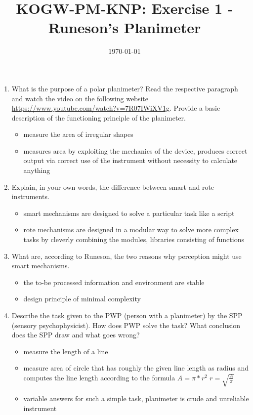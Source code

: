 \documentclass[12pt,english]{scrartcl}
\title{KOGW-PM-KNP:  Exercise 1 - Runeson's Planimeter}
\author{}
\date{\today}
\begin{document}
\maketitle

\begin{enumerate}
 \item What is the purpose of a polar planimeter? Read the respective paragraph and watch the video on the following website \url{https://www.youtube.com/watch?v=7R07IWiXV1g}. Provide a basic description of the functioning principle of the planimeter.
  \begin{itemize}
   \color{blue} 
   \item measure the area of irregular shapes
   \item measures area by exploiting the mechanics of the device, produces correct output via correct use of the instrument without necessity to calculate anything
  \end{itemize}

 \item Explain, in your own words, the difference between smart and rote instruments.
  \begin{itemize}
   \color{blue} 
   \item smart mechanisms are designed to solve a particular task like a script
   \item rote mechanisms are designed in a modular way to solve more complex tasks by cleverly combining the modules, libraries consisting of functions
  \end{itemize}

 \item What are, according to Runeson, the two reasons why perception might use smart mechanisms. 
  \begin{itemize}
   \color{blue} 
   \item the to-be processed information and environment are stable 
   \item design principle of minimal complexity
  \end{itemize}

 \item Describe the task given to the PWP (person with a planimeter) by the SPP (sensory psychophysicist). How does PWP solve the task? What conclusion does the SPP draw and what goes wrong? 
  \begin{itemize}
   \color{blue} 
   \item measure the length of a line
   \item measure area of circle that has roughly the given line length as radius and computes the line length according to the formula $A=\pi*r^2$ $r = \sqrt{\frac{A}{\pi}}$
   \item variable answers for such a simple task, planimeter is crude and unreliable instrument
  \end{itemize}


\end{enumerate}
\end{document}
